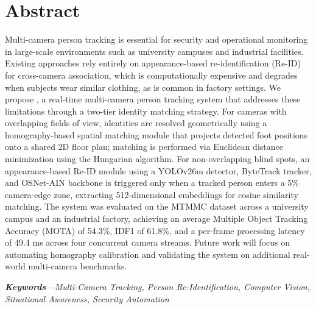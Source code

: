 \chapter*{Abstract}
\label{chap:abstract}

Multi-camera person tracking is essential for security and operational monitoring in large-scale environments such as university campuses and industrial facilities. Existing approaches rely entirely on appearance-based re-identification (Re-ID) for cross-camera association, which is computationally expensive and degrades when subjects wear similar clothing, as is common in factory settings. We propose \usevar{\srsTitle}, a real-time multi-camera person tracking system that addresses these limitations through a two-tier identity matching strategy. For cameras with overlapping fields of view, identities are resolved geometrically using a homography-based spatial matching module that projects detected foot positions onto a shared 2D floor plan; matching is performed via Euclidean distance minimization using the Hungarian algorithm. For non-overlapping blind spots, an appearance-based Re-ID module using a YOLOv26m detector, ByteTrack tracker, and OSNet-AIN backbone is triggered only when a tracked person enters a 5\% camera-edge zone, extracting 512-dimensional embeddings for cosine similarity matching. The system was evaluated on the MTMMC dataset across a university campus and an industrial factory, achieving an average Multiple Object Tracking Accuracy (MOTA) of 54.3\%, IDF1 of 61.8\%, and a per-frame processing latency of 49.4 ms across four concurrent camera streams. Future work will focus on automating homography calibration and validating the system on additional real-world multi-camera benchmarks.

\par
\textit{\textbf{Keywords}---Multi-Camera Tracking, Person Re-Identification, Computer Vision, Situational Awareness, Security Automation}